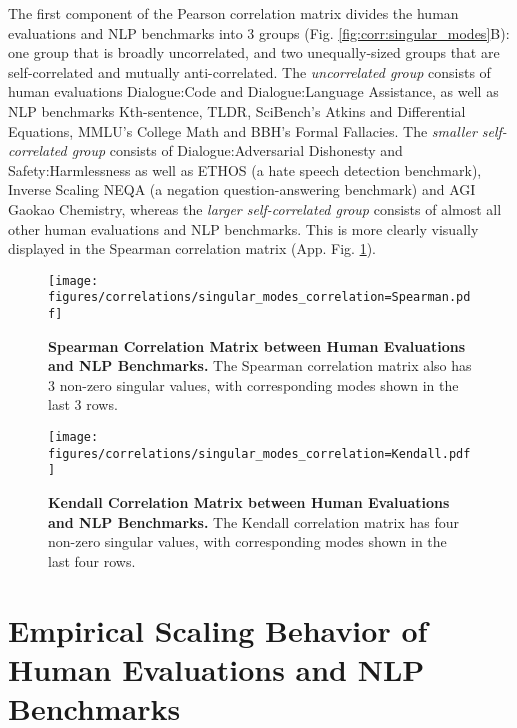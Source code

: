 The first component of the Pearson correlation matrix divides the human evaluations and NLP benchmarks into 3 groups (Fig. \ref{fig:corr:singular_modes}B): one group that is broadly uncorrelated, and two unequally-sized groups that are self-correlated and mutually anti-correlated. The \textit{uncorrelated group} consists of human evaluations Dialogue:Code and Dialogue:Language Assistance, as well as NLP benchmarks Kth-sentence, TLDR, SciBench's Atkins and Differential Equations, MMLU's College Math and BBH's Formal Fallacies. The \textit{smaller self-correlated group} consists of Dialogue:Adversarial Dishonesty and Safety:Harmlessness as well as ETHOS (a hate speech detection benchmark), Inverse Scaling NEQA (a negation question-answering benchmark) and AGI Gaokao Chemistry, whereas the \textit{larger self-correlated group} consists of almost all other human evaluations and NLP benchmarks. This is more clearly visually displayed in the Spearman correlation matrix (App. Fig. \ref{app:fig:spearman_correlation}).


\clearpage


\begin{figure}
    \centering
    \texttt{[image: figures/correlations/singular\_modes\_correlation=Spearman.pdf]}
    \caption{\textbf{Spearman Correlation Matrix between Human Evaluations and NLP Benchmarks.} The Spearman correlation matrix also has 3 non-zero singular values, with corresponding modes shown in the last 3 rows.}
    \label{app:fig:spearman_correlation}
\end{figure}

\clearpage

\begin{figure}
    \centering
    \texttt{[image: figures/correlations/singular\_modes\_correlation=Kendall.pdf]}
    \caption{\textbf{Kendall Correlation Matrix between Human Evaluations and NLP Benchmarks.} The Kendall correlation matrix has four non-zero singular values, with corresponding modes shown in the last four rows.}
    \label{app:fig:kendall_correlation}
\end{figure}


\clearpage
\section{Empirical Scaling Behavior of Human Evaluations and NLP Benchmarks}
\label{app:empirical_scaling_behavior}

